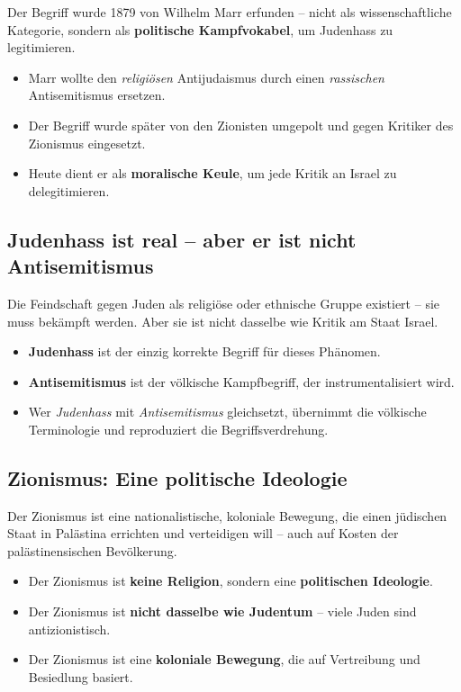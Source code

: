 Der Begriff wurde 1879 von Wilhelm Marr erfunden – nicht als wissenschaftliche Kategorie, sondern als \textbf{politische Kampfvokabel}, um Judenhass zu legitimieren.

\begin{itemize}
    \item Marr wollte den \emph{religiösen} Antijudaismus durch einen \emph{rassischen} Antisemitismus ersetzen.
    \item Der Begriff wurde später von den Zionisten umgepolt und gegen Kritiker des Zionismus eingesetzt.
    \item Heute dient er als \textbf{moralische Keule}, um jede Kritik an Israel zu delegitimieren.
\end{itemize}

\subsection{Judenhass ist real – aber er ist nicht Antisemitismus}

Die Feindschaft gegen Juden als religiöse oder ethnische Gruppe existiert – sie muss bekämpft werden. Aber sie ist nicht dasselbe wie Kritik am Staat Israel.

\begin{itemize}
    \item \textbf{Judenhass} ist der einzig korrekte Begriff für dieses Phänomen.
    \item \textbf{Antisemitismus} ist der völkische Kampfbegriff, der instrumentalisiert wird.
    \item Wer \emph{Judenhass} mit \emph{Antisemitismus} gleichsetzt, übernimmt die völkische Terminologie und reproduziert die Begriffsverdrehung.
\end{itemize}

\subsection{Zionismus: Eine politische Ideologie}

Der Zionismus ist eine nationalistische, koloniale Bewegung, die einen jüdischen Staat in Palästina errichten und verteidigen will – auch auf Kosten der palästinensischen Bevölkerung.

\begin{itemize}
    \item Der Zionismus ist \textbf{keine Religion}, sondern eine \textbf{politischen Ideologie}.
    \item Der Zionismus ist \textbf{nicht dasselbe wie Judentum} – viele Juden sind antizionistisch.
    \item Der Zionismus ist eine \textbf{koloniale Bewegung}, die auf Vertreibung und Besiedlung basiert.
\end{itemize}

